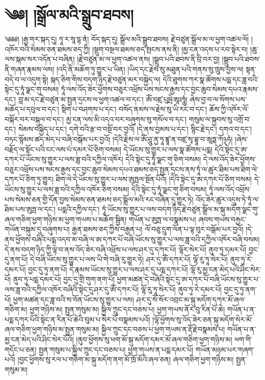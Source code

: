 \chapter{༄༅། །སྒྲོལ་མའི་སྒྲུབ་ཐབས།}༄༅༅། །རྒྱ་གར་སྐད་དུ། ཏཱ་ར་སཱ་དྷ་ནཾ། བོད་སྐད་དུ། སྒྲོལ་མའི་སྒྲུབ་ཐབས། རྗེ་བཙུན་སྒྲོལ་མ་ལ་ཕྱག་འཚལ་ལོ། །འཁོར་བའི་སེམས་ཅན་ཐམས་ཅད་ཀྱི། །སྡུག་བསྔལ་ཐམས་ཅད་སྤངས་ནས་ནི། །མྱ་ངན་འདས་པ་རབ་སྟེར་བ། །ཆུ་ལས་སྐམ་སར་འདོན་པ་བཞིན། །རྗེ་བཙུན་མ་ལ་ཕྱག་འཚལ་ནས། །སྒྲུབ་པའི་ཐབས་ནི་བྲི་བར་བྱ། །སྒྲུབ་པའི་ཐབས་ནི་གཞན་རྣམས་ལས། །འདི་ནི་མཆོག་ཏུ་གྱུར་པ་ཡིན། །ཡིད་དང་རྗེས་སུ་མཐུན་པའི་གནས་སུ་ཁྲུས་བྱས་ལ། སྟན་བདེ་བ་ལ་འདུག་སྟེ། སྐད་ཅིག་གིས་བདག་ཉིད་རྗེ་བཙུན་མར་བསྐྱེད་ལ། དེའི་ཐུགས་ཀར་སྣ་ཚོགས་པདྨ་དང་ཟླ་བའི་སྟེང་དུ་ཏཱཾ་ལྗང་གུ་བསམ། ཏཱཾ་ལས་འོད་ཟེར་ཕྱོགས་བཅུར་འཕྲོས་པས་སངས་རྒྱས་དང་བྱང་ཆུབ་སེམས་དཔའ་རྣམས་དང་། བླ་མ་དང་རྗེ་བཙུན་མ་སྤྱན་དྲངས་ལ་ཕྱག་འཚལ་བ་དང་། ཨོཾ་བཛྲ་པུཥྤེ་ཨཱཿཧཱུཾ། ཞེས་བྱ་བ་ལ་སོགས་པས་མཆོད་པ་དབུལ་བ་དང་། སྡིག་པ་བཤགས་པ་དང་། བསོད་ནམས་ལ་རྗེས་སུ་ཡི་རང་བ་དང་། ཆོས་ཀྱི་འཁོར་ལོ་བསྐོར་བར་བསྐུལ་བ་དང་། མྱ་ངན་ལས་མི་འདའ་བར་བཞུགས་སུ་གསོལ་བ་དང་། གསུམ་ལ་སྐྱབས་སུ་འགྲོ་བ་དང་། སེམས་བསྐྱེད་པ་དང་། དགེ་བའི་རྩ་བ་བསྔོ་བར་བྱའོ། །དེ་ནས་བྱམས་པ་དང་། སྙིང་རྗེ་དང་། དགའ་བ་དང་། བཏང་སྙོམས་ཚད་མེད་པ་བཞི་བསྒོམ་པར་བྱའོ། །དེའི་རྗེས་ལ་ཨོཾ་ཤཱུ་ནྱ་ཏཱ་ཛྙཱ་ན་བཛྲ་སྭ་བྷཱ་བ་ཨཱཏྨ་ཀོ྅ཧཾ། །ཞེས་བརྗོད་ལ་སྟོང་པའི་ངང་ལས་པཾ་དམར་པོ་ཅིག་བསམ། དེ་ཡོངས་སུ་གྱུར་པ་ལས་སྣ་ཚོགས་པདྨ། དེའི་སྟེང་དུ་ཨ་དཀར་པོ་ཡོངས་སུ་གྱུར་པ་ལས་ཟླ་བའི་དཀྱིལ་འཁོར། དེའི་སྟེང་དུ་ཏཱཾ་ལྗང་གུ་ཅིག་བསམ། དེ་ལས་འོད་ཟེར་ཕྱོགས་བཅུར་འཕྲོས་པས་སངས་རྒྱས་དང་བྱང་ཆུབ་སེམས་དཔའ་ཐམས་ཅད་སྤྱན་དྲངས་ནས་ཏཱཾ་ལ་ཚུར་ཐིམ་པས་ཐིག་ལེ་དཀར་པོ་ཅིག་ཏུ་གྱུར། ཐིག་ལེ་དེ་ཡོངས་སུ་གྱུར་པ་ལས་ཨུཏྤལ་སྔོན་པོའོ། །དེའི་སྟེང་དུ་ཨ་དཀར་པོ་ཅིག་བསམ། དེ་ཡོངས་སུ་གྱུར་པ་ལས་ཟླ་བའི་དཀྱིལ་འཁོར་ཅིག་བསམ། དེའི་སྟེང་དུ་ཏཱཾ་ལྗང་གུ་ཅིག་བསམ། ཏཱཾ་ལས་འོད་འཕྲོས་པས་སེམས་ཅན་གྱི་དོན་བྱས་སེམས་ཅན་ཐམས་ཅད་སྒྲོལ་མའི་རང་བཞིན་དུ་གྱུར་ཏེ། འོད་ཟེར་ཚུར་འདུས་ཏེ་ཏཱཾ་ལ་ཐིམ་པས་ཨུཏྤ་ལ་དང་། པདྨའི་དཀྱིལ་དང་། ཏཱཾ་ཡོངས་སུ་གྱུར་པ་ལས་བདག་ཉིད་རྗེ་བཙུན་སྒྲོལ་མ་སྐུ་མདོག་ལྗང་གུ་ཞལ་གཅིག་ཕྱག་གཉིས་མ་ཕྱག་གཡས་པ་མཆོག་སྦྱིན། གཡོན་པ་ཨུཏྤ་ལ་བསྣམས་པ། ཞབས་གཡས་བརྐྱང་གཡོན་བསྐུམ་དུ་བཞུགས་པ། རྒྱན་ཐམས་ཅད་ཀྱིས་བརྒྱན་པ། ལོ་བཅུ་དྲུག་ལོན་པ་ལྟ་བུར་བསྒོམ་པར་བྱའོ། །དེ་ནས་ཕྱོགས་བཞིའི་པདྨ་འདབ་མ་བཞི་ལ་ཨ་དཀར་པོ་བཞི་ཡོངས་སུ་གྱུར་པ་ལས་ཟླ་བའི་དཀྱིལ་འཁོར་བཞི་བསམ། དེ་ནས་བདག་ཉིད་ཀྱི་ལྟེ་བ་ནས་འོད་ཟེར་བཞི་འཕྲོས་པ་ལས་ཤར་དུ་དཀར་པོ། ལྷོར་སེར་པོ། ནུབ་ཏུ་དམར་པོ། བྱང་དུ་ནག་པོ། དེ་བཞི་ཡོངས་སུ་གྱུར་པ་ལས་ཡི་གེ་བཞི་རུ་གྱུར་ཏེ། ཤར་དུ་ཨོཾ་དཀར་པོ། ལྷོ་རུ་ཏཱ་སེར་པོ། ནུབ་ཏུ་རེ་དམར་པོ། བྱང་དུ་ཏུ་ནག་པོ། དེ་རྣམས་ཡོངས་སུ་གྱུར་པ་ལས་ཤར་དུ་པདྨ་དཀར་པོ། ལྷོ་རུ་མྱ་ངན་མེད་པའི་ཤིང་སེར་པོ། ནུབ་ཏུ་པདྨ་དམར་པོ། བྱང་དུ་གྲི་གུག་ནག་པོ། ཕྱག་མཚན་དེ་བཞིའི་སྟེང་དུ་ཨ་དཀར་པོ་བཞི་ཡོངས་སུ་གྱུར་པ་ལས་ཟླ་བའི་དཀྱིལ་འཁོར་བཞིའི་སྟེང་དུ་ཤར་དུ་ཨོཾ་དཀར་པོ། ལྷོ་རུ་ཏཱ་སེར་པོ། ནུབ་ཏུ་རེ་དམར་པོ། བྱང་དུ་ཏུ་ནག་པོ། ཕྱག་མཚན་དང་ཟླ་བའི་ས་བོན་ཡོངས་སུ་གྱུར་པ་ལས། ཤར་དུ་སོ་སོར་འབྲང་མ་སྐུ་མདོག་དཀར་མོ་ཞལ་གཅིག་མ། ཕྱག་གཉིས་མ། སྤྱན་གསུམ་མ། སྐྱིལ་ཀྲུང་དང་བཅས་པ། ཕྱག་གཡས་ནོར་བུ་རིན་པོ་ཆེ། གཡོན་པ་ན་པདྨ་དཀར་པོའི་སྟེང་ན་རིན་པོ་ཆེའི་བུམ་པ་སེར་པོ་བསྣམས་པའོ། །ལྷོ་ཕྱོགས་སུ་འོད་ཟེར་ཅན་སྐུ་མདོག་སེར་མོ་ཞལ་གཅིག་ཕྱག་གཉིས་མ་སྤྱན་གསུམ་མ། སྐྱིལ་ཀྲུང་དང་བཅས་པ་ཕྱག་གཡས་ན་རྡོ་རྗེ་བསྣམས་པ། གཡོན་པ་ན་མྱ་ངན་མེད་པའི་ཤིང་སེར་པོའོ། །ནུབ་ཕྱོགས་སུ་ཕག་མོ་སྐུ་མདོག་དམར་མོ་ཞལ་གཅིག་ཕྱག་གཉིས་མ། ཕག་གི་གདོང་པ་ཅན། སྤྱན་གསུམ་པ་སྐྱིལ་ཀྲུང་དང་བཅས་པ། ཕྱག་གཡས་ན་པདྨ་དམར་པོ། གཡོན་མཉམ་པར་གཞག་པའོ། །བྱང་ཕྱོགས་སུ་རལ་པ་གཅིག་མ་སྐུ་མདོག་ནག་མོ་ཁྲོ་མོའི་ཞལ་ཅན། ཞལ་གཅིག་ཕྱག་གཉིས་མ། སྤྱན་གསུམ་མ། 